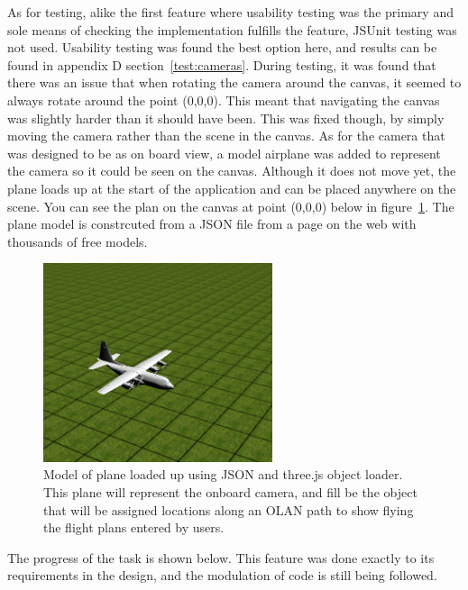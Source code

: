 As for testing, alike the first feature where usability testing was the primary and sole means of checking the implementation fulfills the feature, JSUnit testing was not used. Usability testing was found the best option here, and results can be found in appendix D section~\ref{test:cameras}. During testing, it was found that there was an issue that when rotating the camera around the canvas, it seemed to always rotate around the point (0,0,0). This meant that navigating the canvas was slightly harder than it should have been. This was fixed though, by simply moving the camera rather than the scene in the canvas. As for the camera that was designed to be as on board view, a model airplane was added to represent the camera so it could be seen on the canvas. Although it does not move yet, the plane loads up at the start of the application and can be placed anywhere on the scene. You can see the plan on the canvas at point (0,0,0) below in figure~\ref{fig:plane}. The plane model is constrcuted from a JSON file from a page on the web with thousands of free models.

\clearpage

\begin{figure}[h!]
  \centering
      \includegraphics[width=0.6\textwidth]{images/plane.png}
  \caption{Model of plane loaded up using JSON and three.js object loader. This plane will represent the onboard camera, and fill be the object that will be assigned locations along an OLAN path to show flying the flight plans entered by users.}
  \label{fig:plane}
\end{figure}

The progress of the task is shown below. This feature was done exactly to its requirements in the design, and the modulation of code is still being followed.

